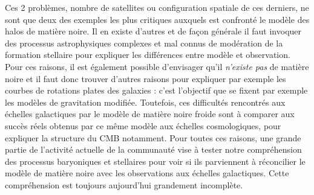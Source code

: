 Ces 2 problèmes, nombre de satellites ou configuration spatiale de ces derniers, ne sont que deux des exemples les plus critiques auxquels est confronté le modèle des halos de matière noire. Il en existe d'autres et de façon générale il faut invoquer des processus astrophysiques complexes et mal connus de modération de la formation stellaire pour expliquer les différences entre modèle et observation. Pour ces raisons, il est également possible d'envisager qu'il \textit{n'existe pas} de matière noire et il faut donc trouver d'autres raisons pour expliquer par exemple les courbes de rotations plates des galaxies : c'est l'objectif que se fixent par exemple les modèles de gravitation modifiée. Toutefois, ces difficultés rencontrés aux échelles galactiques par le modèle de matière noire froide sont à comparer aux succès réels obtenus par ce même modèle aux échelles cosmologiques, pour expliquer la structure du CMB notamment. Pour toutes ces raisons, une grande partie de l'activité actuelle de la communauté vise à tester notre compréhension des processus baryoniques et stellaires pour voir si ils parviennent à réconcilier le modèle de matière noire avec les observations aux échelles galactiques. Cette compréhension est toujours aujourd'hui grandement incomplète.
